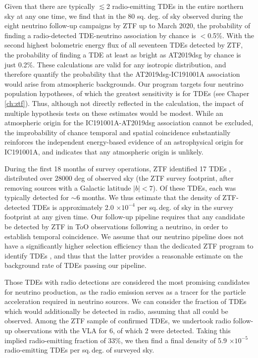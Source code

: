 Given that there are typically $\lesssim$2 radio-emitting TDEs in the entire northern sky at any one time, we find that in the 80 sq. deg. of sky observed during the eight neutrino follow-up campaigns by ZTF up to March 2020, the probability of finding a radio-detected TDE-neutrino association by chance is $<$0.5\%. With the second highest bolometric energy flux of all seventeen TDEs detected by ZTF, the probability of finding a TDE at least as bright as AT2019dsg by chance is just 0.2\%. These calculations are valid for any isotropic distribution, and therefore quantify the probability that the AT2019dsg-IC191001A association would arise from atmospheric backgrounds. Our program targets four neutrino population hypotheses\cite{2019PASP..131g8001G}, of which the greatest sensitivity is for TDEs (see Chaper \ref{ch:ztf}). Thus, although not directly reflected in the calculation, the impact of multiple hypothesis tests on these estimates would be modest. While an atmospheric origin  for the IC191001A-AT2019dsg association cannot be excluded, the improbability of chance temporal and spatial coincidence substantially reinforces the independent energy-based evidence of an astrophysical origin for IC191001A, and indicates that any atmospheric origin is unlikely.

During the first 18 months of survey operations, ZTF identified 17 TDEs \cite{van_velzen_20}, distributed over 28000 deg of observed sky (the ZTF survey footprint, after removing sources with a Galactic latitude $|b|<7$). Of these TDEs, each was typically detected for $\sim$6 months\cite{van_velzen_20}. We thus estimate that the density of ZTF-detected TDEs is approximately 2.0 $\times 10^{-4}$ per sq.\,deg. of sky in the survey footprint at any given time. Our follow-up pipeline requires that any candidate be detected by ZTF in ToO observations following a neutrino, in order to establish temporal coincidence. We assume that our neutrino pipeline does not have a significantly higher selection efficiency than the dedicated ZTF program to identify TDEs \cite{van_velzen_20}, and thus that the latter provides a reasonable estimate on the background rate of TDEs passing our pipeline.

Those TDEs with radio detections are considered the most promising candidates for neutrino production, as the radio emission serves as a tracer for the particle acceleration required in neutrino sources. We can consider the fraction of TDEs which would additionally be detected in radio, assuming that all could be observed. Among the ZTF sample of confirmed TDEs, we undertook radio follow-up observations with the VLA for 6, of which 2 were detected. Taking this implied radio-emitting fraction of 33\%, we then find a final density of 5.9 $\times 10^{-5}$ radio-emitting TDEs per sq.\,deg. of surveyed sky. 

